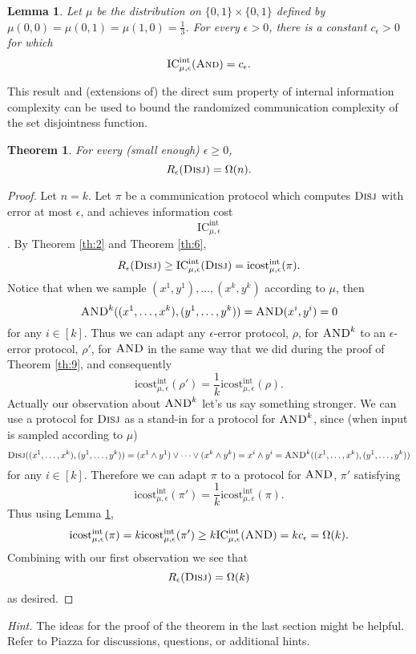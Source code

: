 \documentclass[11pt]{amsart}
\theoremstyle{plain}
\newtheorem{theorem}{Theorem}
\newtheorem{lemma}{Lemma}
\theoremstyle{definition}
\theoremstyle{plain}
\newcommand{\Disj}{\textsc{Disj}}
\newcommand{\ICint}{\mathrm{IC}^{\mathrm{int}}}
\newcommand{\icostint}{\mathrm{icost}^{\mathrm{int}}}
\begin{document}
\begin{lemma}\label{lemma:1}
Let $\mu$ be the distribution on $\{0,1\} \times \{0,1\}$ defined by $\mu(0,0) = \mu(0,1) = \mu(1,0) = \frac13$.
For every $\epsilon > 0$, there is a constant $c_\epsilon > 0$ for which
\[
\ICint_{\mu,\epsilon}(\textsc{And}) = c_\epsilon.
\]
\end{lemma}

This result and (extensions of) the direct sum property of internal information complexity can be used to bound the randomized communication complexity of the set disjointness function.

\begin{theorem}
For every (small enough) $\epsilon \ge 0$, 
\[
R_\epsilon(\Disj) = \Omega(n).
\]
\end{theorem}

\begin{proof}
Let $n=k$. Let $\pi$ be a communication protocol which computes $\Disj$ with error at most $\epsilon$, and achieves information cost
$$\ICint_{\mu,\epsilon}$$ . By Theorem \ref{th:2} and Theorem \ref{th:6},
$$R_\epsilon(\Disj) \geq \ICint_{\mu,\epsilon}(\Disj) = \icostint_{\mu,\epsilon}(\pi).$$
Notice that when we sample $(x^1,y^1), \dots, (x^k,y^k)$ according to $\mu$, then
$$\textsc{AND}^k((x^1,\dots,x^k),(y^1,\dots,y^k)) = \textsc{AND}(x^i,y^i) = 0$$
for any $i \in [k]$. Thus we can adapt any $\epsilon$-error protocol, $\rho$, for $\textsc{AND}^k$ to an $\epsilon$-error protocol, $\rho'$, for $\textsc{AND}$ in the same way that we did during the proof of Theorem \ref{th:9}, and consequently
$$\icostint_{\mu,\epsilon}(\rho') = \frac{1}{k}\icostint_{\mu,\epsilon}(\rho).$$
Actually our observation about $\textsc{AND}^k$ let's us say something stronger. We can use a protocol for $\Disj$ as a stand-in for a protocol for $\textsc{AND}^k$, since (when input is sampled according to $\mu$)
$$\Disj((x^1,\dots, x^k),(y^1,\dots,y^k)) = (x^1\wedge y^1) \lor\dots\lor(x^k\wedge y^k) = x^i\wedge y^i = \textsc{AND}^k((x^1,\dots, x^k),(y^1,\dots,y^k))$$
for any $i\in[k]$. Therefore we can adapt $\pi$ to a protocol for $\textsc{AND}$, $\pi'$ satisfying
$$\icostint_{\mu,\epsilon}(\pi') = \frac{1}{k}\icostint_{\mu,\epsilon}(\pi).$$
Thus using Lemma \ref{lemma:1},
$$\icostint_{\mu,\epsilon}(\pi) = k\icostint_{\mu,\epsilon}(\pi')\geq k\ICint_{\mu,\epsilon}(\textsc{AND}) = kc_\epsilon = \Omega(k).$$
Combining with our first observation we see that
$$R_\epsilon(\Disj) = \Omega(k)$$
as desired.
\end{proof}

\bigskip
\noindent \emph{Hint.} The ideas for the proof of the theorem in the last section might be helpful. Refer to Piazza for discussions, questions, or additional hints.
\end{document}
